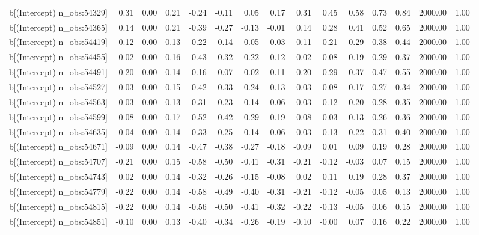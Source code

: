 \begin{table}[ht]
\begin{tabular}{rrrrrrrrrrrrrrr}
  b[(Intercept) n\_obs:54329] & 0.31 & 0.00 & 0.21 & -0.24 & -0.11 & 0.05 & 0.17 & 0.31 & 0.45 & 0.58 & 0.73 & 0.84 & 2000.00 & 1.00 \\ 
  b[(Intercept) n\_obs:54365] & 0.14 & 0.00 & 0.21 & -0.39 & -0.27 & -0.13 & -0.01 & 0.14 & 0.28 & 0.41 & 0.52 & 0.65 & 2000.00 & 1.00 \\ 
  b[(Intercept) n\_obs:54419] & 0.12 & 0.00 & 0.13 & -0.22 & -0.14 & -0.05 & 0.03 & 0.11 & 0.21 & 0.29 & 0.38 & 0.44 & 2000.00 & 1.00 \\ 
  b[(Intercept) n\_obs:54455] & -0.02 & 0.00 & 0.16 & -0.43 & -0.32 & -0.22 & -0.12 & -0.02 & 0.08 & 0.19 & 0.29 & 0.37 & 2000.00 & 1.00 \\ 
  b[(Intercept) n\_obs:54491] & 0.20 & 0.00 & 0.14 & -0.16 & -0.07 & 0.02 & 0.11 & 0.20 & 0.29 & 0.37 & 0.47 & 0.55 & 2000.00 & 1.00 \\ 
  b[(Intercept) n\_obs:54527] & -0.03 & 0.00 & 0.15 & -0.42 & -0.33 & -0.24 & -0.13 & -0.03 & 0.08 & 0.17 & 0.27 & 0.34 & 2000.00 & 1.00 \\ 
  b[(Intercept) n\_obs:54563] & 0.03 & 0.00 & 0.13 & -0.31 & -0.23 & -0.14 & -0.06 & 0.03 & 0.12 & 0.20 & 0.28 & 0.35 & 2000.00 & 1.00 \\ 
  b[(Intercept) n\_obs:54599] & -0.08 & 0.00 & 0.17 & -0.52 & -0.42 & -0.29 & -0.19 & -0.08 & 0.03 & 0.13 & 0.26 & 0.36 & 2000.00 & 1.00 \\ 
  b[(Intercept) n\_obs:54635] & 0.04 & 0.00 & 0.14 & -0.33 & -0.25 & -0.14 & -0.06 & 0.03 & 0.13 & 0.22 & 0.31 & 0.40 & 2000.00 & 1.00 \\ 
  b[(Intercept) n\_obs:54671] & -0.09 & 0.00 & 0.14 & -0.47 & -0.38 & -0.27 & -0.18 & -0.09 & 0.01 & 0.09 & 0.19 & 0.28 & 2000.00 & 1.00 \\ 
  b[(Intercept) n\_obs:54707] & -0.21 & 0.00 & 0.15 & -0.58 & -0.50 & -0.41 & -0.31 & -0.21 & -0.12 & -0.03 & 0.07 & 0.15 & 2000.00 & 1.00 \\ 
  b[(Intercept) n\_obs:54743] & 0.02 & 0.00 & 0.14 & -0.32 & -0.26 & -0.15 & -0.08 & 0.02 & 0.11 & 0.19 & 0.28 & 0.37 & 2000.00 & 1.00 \\ 
  b[(Intercept) n\_obs:54779] & -0.22 & 0.00 & 0.14 & -0.58 & -0.49 & -0.40 & -0.31 & -0.21 & -0.12 & -0.05 & 0.05 & 0.13 & 2000.00 & 1.00 \\ 
  b[(Intercept) n\_obs:54815] & -0.22 & 0.00 & 0.14 & -0.56 & -0.50 & -0.41 & -0.32 & -0.22 & -0.13 & -0.05 & 0.06 & 0.15 & 2000.00 & 1.00 \\ 
  b[(Intercept) n\_obs:54851] & -0.10 & 0.00 & 0.13 & -0.40 & -0.34 & -0.26 & -0.19 & -0.10 & -0.00 & 0.07 & 0.16 & 0.22 & 2000.00 & 1.00 \\ 

\end{tabular}
\end{table}
